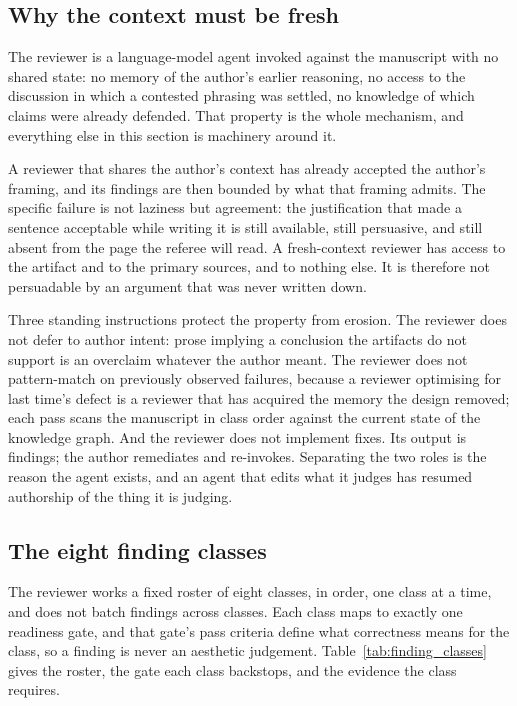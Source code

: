 \documentclass[11pt]{article}
\begin{document}
\subsection{Why the context must be fresh}

The reviewer is a language-model agent invoked against the manuscript
with no shared state: no memory of the author's earlier reasoning, no
access to the discussion in which a contested phrasing was settled,
no knowledge of which claims were already defended. That property is
the whole mechanism, and everything else in this section is
machinery around it.

A reviewer that shares the author's context has already accepted the
author's framing, and its findings are then bounded by what that
framing admits. The specific failure is not laziness but agreement:
the justification that made a sentence acceptable while writing it is
still available, still persuasive, and still absent from the page the
referee will read. A fresh-context reviewer has access to the
artifact and to the primary sources, and to nothing else. It is
therefore not persuadable by an argument that was never written down.

Three standing instructions protect the property from erosion. The
reviewer does not defer to author intent: prose implying a conclusion
the artifacts do not support is an overclaim whatever the author
meant. The reviewer does not pattern-match on previously observed
failures, because a reviewer optimising for last time's defect is a
reviewer that has acquired the memory the design removed; each pass
scans the manuscript in class order against the current state of the
knowledge graph. And the reviewer does not implement fixes. Its
output is findings; the author remediates and re-invokes. Separating
the two roles is the reason the agent exists, and an agent that
edits what it judges has resumed authorship of the thing it is
judging.

\subsection{The eight finding classes}

The reviewer works a fixed roster of eight classes, in order, one
class at a time, and does not batch findings across classes. Each
class maps to exactly one readiness gate, and that gate's pass
criteria define what correctness means for the class, so a finding is
never an aesthetic judgement. Table~\ref{tab:finding_classes} gives
the roster, the gate each class backstops, and the evidence the class
requires.
\end{document}
